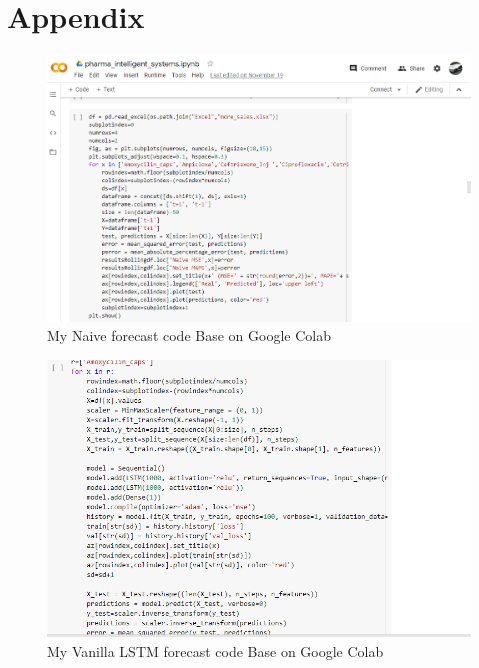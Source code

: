 \documentclass[12pt]{report}
\begin{document}




\appendix

\chapter{Appendix}


\begin{figure}[H]%
  \begin {center}
  \includegraphics[width=1\textwidth]{images/NaiveCode.PNG}
  \caption{My Naive forecast code Base on Google Colab}
  \label{fig:ecg}
  \end {center}
\end{figure}
  
\begin{figure}[H]%
  \begin {center}
  \includegraphics[width=1\textwidth]{images/VanillaLSTM.PNG}
  \caption{My Vanilla LSTM forecast code Base on Google Colab}
  \label{fig:ecg}
  \end {center}
\end{figure}
\end{document}
